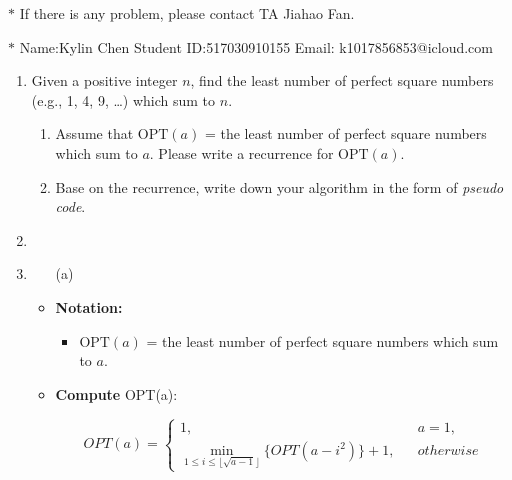 \documentclass[12pt,a4paper]{article}
\makeatletter
\newtheorem*{solution}{Solution}
\theoremstyle{definition}
\renewenvironment{solution}[1][Solution] {\par\pushQED{\qed}\normalfont\topsep6\p@\@plus6\p@\relax\trivlist\item[\hskip\labelsep\bfseries#1\@addpunct{.}]\ignorespaces}{\popQED\endtrivlist\@endpefalse} \makeatother
\makeatother
\begin{document}
\noindent

\noindent{}
\begin{center}
\footnotesize{\color{red}$*$ If there is any problem, please contact TA Jiahao Fan.}

\footnotesize{\color{blue}$*$ Name:Kylin Chen  \quad Student ID:517030910155 \quad Email: k1017856853@icloud.com}
\end{center}

\begin{enumerate}
    \item
    Given a positive integer $n$, find the least number of perfect square numbers (e.g., 1, 4, 9, \dots) which sum to $n$.
    \begin{enumerate}
        \item
        Assume that $\text{OPT}(a)$ = the least number of perfect square numbers which sum to $a$. Please write a recurrence for $\text{OPT}(a)$.

        \item
        Base on the recurrence, write down your algorithm in the form of \emph{pseudo code}.
    \end{enumerate}

    \begin{solution}\item
    \renewcommand{\qedsymbol}{}
    \begin{itemize}
        \item [(a)]
        \item \textbf{Notation:}\par
            \begin{itemize}
                \item $\text{OPT}(a)$ = the least number of perfect square numbers which sum to $a$.
            \end{itemize}\par
        \item \textbf{Compute }OPT(a):

        $$ OPT(a)=\left\{
            \begin{array}{lcl}
            1,       &      & {a=1,}\\
            \min \limits_{1 \leq i \leq \lfloor \sqrt{a-1} \rfloor}\{OPT(a-i^2)\}+1,     &      & {otherwise}
            \end{array} \right. $$
        

\end{itemize}
\end{solution}
\end{enumerate}
\end{document}
